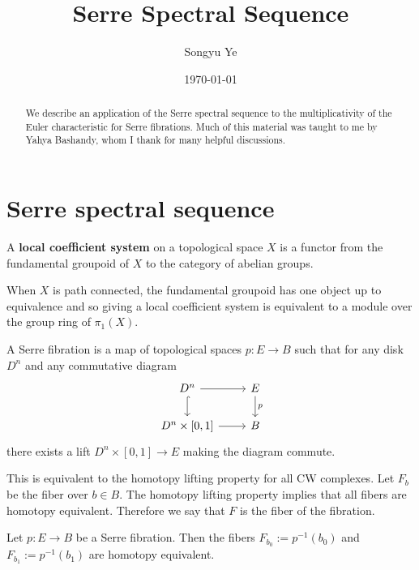 \documentclass[12pt]{article}
\begin{document}
\rhead{\today}
\cfoot{\thepage}

\title{Serre Spectral Sequence} 

\author{Songyu Ye}
\date{\today}
\maketitle


\begin{abstract}
We describe an application of the Serre spectral sequence to the multiplicativity of the Euler characteristic for Serre fibrations. Much of this material was taught to me by Yahya Bashandy, whom I thank for many helpful discussions.
\end{abstract}

\tableofcontents

\section{Serre spectral sequence}
\begin{definition}
    A \textbf{local coefficient system} on a topological space $X$ is a functor from the fundamental groupoid of $X$ to the category of abelian groups.
\end{definition}
When $X$ is path connected, the fundamental groupoid has one object up to equivalence and so giving a local coefficient system is equivalent to a module over the group ring of $\pi_1(X)$. 

\begin{definition}
A Serre fibration is a map of topological spaces $p:E \to B$ such that for any disk $D^n$ and any commutative diagram
    \[\begin{tikzcd}
    D^n \arrow[r] \arrow[d, hook] & E \arrow[d, "p"] \\
    D^n \times [0,1] \arrow[r] & B
    \end{tikzcd}\]
    there exists a lift $D^n \times [0,1] \to E$ making the diagram commute. 
\end{definition}
This is equivalent to the homotopy lifting property for all CW complexes. Let $F_b$ be the fiber over $b \in B$. The homotopy lifting property implies that all fibers are homotopy equivalent. Therefore we say that $F$ is the fiber of the fibration.

\begin{proposition}
Let $p: E \to B$ be a Serre fibration. Then the fibers $F_{b_0} := p^{-1}(b_0)$ and $F_{b_1} := p^{-1}(b_1)$ are homotopy equivalent.
\end{proposition}
\end{document}
